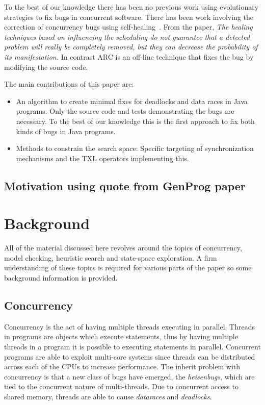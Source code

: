 \documentclass[10pt, conference, compsocconf]{IEEEtran}
\begin{document}
To the best of our knowledge there has been no previous work using evolutionary
strategies to fix bugs in concurrent software.  There has been work involving
the correction of concurrency bugs using self-healing~\cite{LVK08}. From the
paper, \textit{The healing techniques based on influencing the scheduling do
not guarantee that a detected problem will really be completely removed, but
they can decrease the probability of its manifestation.} In contrast ARC is an
off-line technique that fixes the bug by modifying the source code.

The main contributions of this paper are:

\begin{itemize}

\item An algorithm to create minimal fixes for deadlocks and data races in Java
programs. Only the source code and tests demonstrating the bugs are necessary.
To the best of our knowledge this is the first approach to fix both kinds of
bugs in Java programs.

\item Methods to constrain the search space: Specific targeting of
synchronization mechanisms and the TXL operators implementing this.

\end{itemize}


\subsection{Motivation using quote from GenProg paper}


\section{Background}
\label{sec:background}

All of the material discussed here revolves around the topics of concurrency,
model checking, heuristic search and state-space exploration. A firm
understanding of these topics is required for various parts of the paper so
some background information is provided.

\subsection{Concurrency}
\label{sec:concurrency}

Concurrency is the act of having multiple threads executing in parallel.
Threads in programs are objects which execute statements, thus by having
multiple threads in a program it is possible to executing statements in
parallel. Concurrent programs are able to exploit multi-core systems since
threads can be distributed across each of the CPUs to increase performance. The
inherit problem with concurrency is that a new class of bugs have emerged, the
\textit{heisenbugs}, which are tied to the concurrent nature of multi-threads.
Due to concurrent access to shared memory, threads are able to cause
\textit{dataraces} and \textit{deadlocks}.
\end{document}
